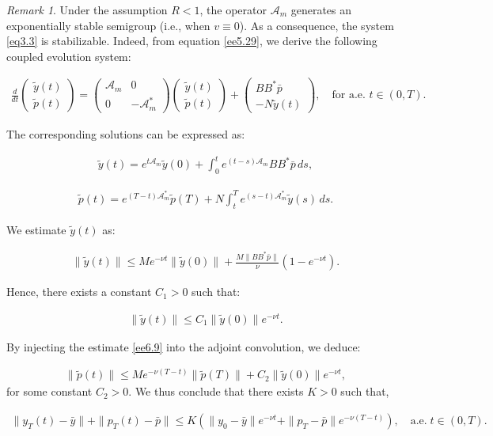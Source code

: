 \documentclass[10pt, a4]{amsart}
\newcounter{assu}
\theoremstyle{plain}
\theoremstyle{definition}
\theoremstyle{remark}
\newtheorem{remark}[lemma]{Remark}
\numberwithin{equation}{section}
\begin{document}
\begin{remark}
Under the assumption $R < 1$, the operator $\mathcal{A}_m$ generates an exponentially stable semigroup (i.e., when $v \equiv 0$). As a consequence, the system \eqref{eq3.3} is stabilizable. Indeed, from equation \eqref{ee5.29}, we derive the following coupled evolution system:

\begin{align}
    \frac{d}{dt}
\begin{pmatrix}
\tilde{y}(t) \\
\tilde{p}(t)
\end{pmatrix}
=
\begin{pmatrix}
\mathcal{A}_m & 0 \\
0 & -\mathcal{A}_m^*
\end{pmatrix}
\begin{pmatrix}
\tilde{y}(t) \\
\tilde{p}(t)
\end{pmatrix}
+
\begin{pmatrix}
BB^*\bar{p} \\
-N\tilde{y}(t)
\end{pmatrix},
\quad \text{for a.e. } t\in(0,T).
\end{align}

The corresponding solutions can be expressed as:

\begin{align}
    \tilde{y}(t) = e^{t\mathcal{A}_m} \tilde{y}(0) + \int_0^t e^{(t-s)\mathcal{A}_m} BB^*\bar{p} \, ds,
\end{align}

\begin{align}
    \tilde{p}(t) = e^{(T-t)\mathcal{A}_m^*} \tilde{p}(T) + N \int_t^T e^{(s-t)\mathcal{A}_m^*} \tilde{y}(s)\,ds.
\end{align}

We estimate $\tilde{y}(t)$ as:

\begin{align}
    \|\tilde{y}(t)\|
\le M e^{-\nu t} \|\tilde{y}(0)\|
+ \frac{M \|BB^*\bar{p}\|}{\nu} \left(1 - e^{-\nu t} \right).
\end{align}

Hence, there exists a constant $C_1 > 0$ such that:

\begin{align}\label{ee6.9}
    \|\tilde{y}(t)\| \le C_1 \|\tilde{y}(0)\| e^{-\nu t}.
\end{align}

By injecting the estimate \eqref{ee6.9} into the adjoint convolution, we deduce:

\begin{align}
    \|\tilde{p}(t)\|
\le M e^{-\nu(T - t)} \|\tilde{p}(T)\|
+ C_2 \|\tilde{y}(0)\| e^{-\nu t},
\end{align}
for some constant $C_2 > 0.$ We thus conclude that there exists $K > 0$ such that,

\begin{align}
    \|y_T(t) - \bar{y}\| + \|p_T(t) - \bar{p}\|
\le K\left(
\|y_0 - \bar{y}\| e^{-\nu t}
+ \|p_T - \bar{p}\| e^{-\nu(T - t)}
\right),\quad \text{a.e.}\; t \in (0,T).
\end{align}
\end{remark}
\end{document}
